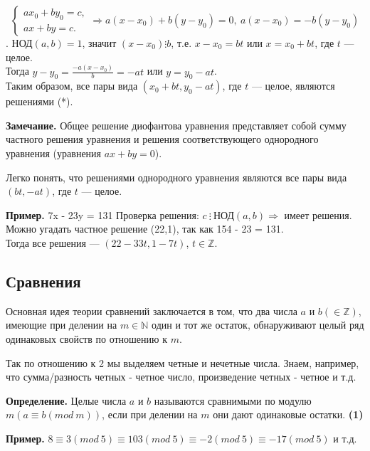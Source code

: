 \documentclass{article}
\begin{document}
    \[ \begin{cases}
        ax_0 + by_0 = c,\\
        ax + by = c.
    \end{cases} \Rightarrow a(x - x_0) + b(y - y_0) = 0,\ a(x - x_0) = -b(y - y_0) \].
    \( \textrm{НОД}(a,b) = 1 \), значит \( (x - x_0) \vdots b \), т.е. \( x - x_0 = bt \) или \( x = x_0 + bt \), где \( t \) --- целое.\\
    Тогда \( y - y_0 = \frac{-a(x - x_0)}{b} = -at \) или \( y = y_0 - at \).\\
    Таким образом, все пары вида \( (x_0 + bt, y_0 - at) \), где \( t \) --- целое, являются решениями (*).

    \textbf{Замечание.} Общее решение диофантова уравнения представляет собой сумму частного решения уравнения и решения соответствующего однородного уравнения (уравнения \( ax + by = 0 \)).

    Легко понять, что решениями однородного уравнения являются все пары вида \( (bt, -at) \), где \( t \) --- целое.

    \textbf{Пример.} 7x - 23y = 131
    Проверка решения: \( c\ \vdots \ \textrm{НОД}(a,b) \Rightarrow \) имеет решения.\\ 
    Можно угадать частное решение (22,1), так как 154 - 23 = 131.\\
    Тогда все решения --- \( (22-33t,1-7t) \), \( t \in \mathbb{Z} \).

    \subsection{Сравнения}

    Основная идея теории сравнений заключается в том, что два числа \( a \) и \( b (\in \mathbb{Z}) \), имеющие при делении на \( m \in \mathbb{N} \) один и тот же остаток, обнаруживают целый ряд одинаковых свойств по отношению к \( m \).

    Так по отношению к 2 мы выделяем четные и нечетные числа. Знаем, например, что сумма/разность четных - четное число, произведение четных - четное и т.д.

    \textbf{Определение.} Целые числа \( a \) и \( b \) называются сравнимыми по модулю \( m (a \equiv b (mod\ m)) \), если при делении на \( m \) они дают одинаковые остатки. \textbf{(1)}
    
    \textbf{Пример.} \( 8 \equiv 3 (mod\ 5) \equiv 103 (mod\ 5) \equiv -2 (mod\ 5) \equiv -17 (mod\ 5) \) и т.д.
\end{document}

